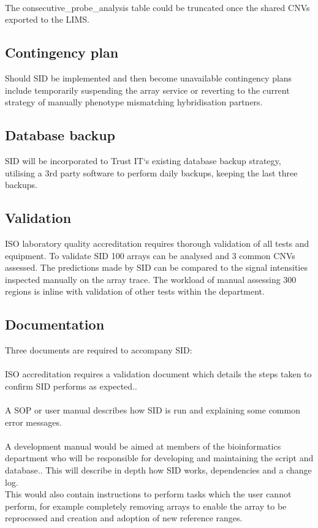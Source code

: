 \paragraph*{}
The consecutive\_probe\_analysis table could be truncated once the shared CNVs exported to the LIMS.

\subsection{Contingency plan}
Should SID be implemented and then become unavailable contingency plans include temporarily suspending the array service or reverting to the current strategy of manually phenotype mismatching hybridisation partners.
\subsection{Database backup}
SID will be incorporated to Trust IT`s existing database backup strategy, utilising a 3rd party software to perform daily backups, keeping the last three backups. 

\subsection{Validation}
ISO laboratory quality accreditation requires thorough validation of all tests and equipment. To validate SID 100 arrays can be analysed and 3 common CNVs assessed. The predictions made by SID can be compared to the signal intensities inspected manually on the array trace. The workload of manual assessing 300 regions is inline with validation of other tests within the department.

\subsection{Documentation}
Three documents are required to accompany SID:
\paragraph*{}
ISO accreditation requires a validation document which details the steps taken to confirm SID performs as expected..
\paragraph*{}
A SOP or user manual describes how SID is run and explaining some common error messages.
\paragraph*{}
A development manual would be aimed at members of the bioinformatics department who will be responsible for developing and maintaining the script and database.. This will describe in depth how SID works, dependencies and a change log. 
\\
This would also contain instructions to perform tasks which the user cannot perform, for example completely removing arrays to enable the array to be reprocessed and creation and adoption of new reference ranges.
